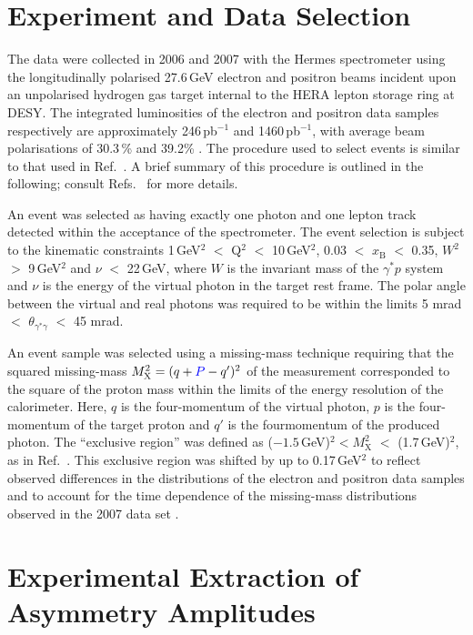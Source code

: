 \section{Experiment and Data Selection}
The data were collected in 2006 and 2007 with the H{\sc ermes}
spectrometer \cite{Ack98} using the longitudinally polarised 27.6\,GeV
electron and positron beams incident upon an unpolarised hydrogen gas
target internal to the HERA lepton storage ring at DESY. The integrated
luminosities of the electron and positron data samples respectively are
approximately 246\,pb$^{-1}$ and 1460\,pb$^{-1}$, with average beam polarisations of 30.3\,\% and 39.2\% \cite{Ben01}. The procedure used to select events is similar to that used in Ref.~\cite{Air09}.
A brief summary of this procedure is outlined in the following; consult
Refs.~\cite{Zei09,Bur10} for more details. 

An event
was selected as having exactly one photon and one lepton
track detected within the acceptance of the spectrometer.
The event selection is subject to the kinematic constraints 1\,GeV$^{2}$ $<$
Q$^{2}$ $<$ 10\,GeV$^{2}$, 0.03 $<$ $x_{\textrm{B}}$ $<$ 0.35, $W^{2}$ $>$
9\,GeV$^{2}$ and $\nu$ $<$ 22\,GeV, where $W$ is the invariant mass of the
$\gamma^{*}p$ system and $\nu$ is the energy of the virtual photon in the target
rest frame. The polar angle between the virtual and real photons was required to
be within the limits 5 mrad $<$
$\theta_{\gamma^{*}\gamma}$ $<$ 45 mrad. 

An event sample was selected using a missing-mass technique requiring
that the squared missing-mass $M_{\textrm{X}}^{2}=(q+{\color{blue}{P}\color{black}}-q')^{2}$
of the  measurement
corresponded to the square of the proton mass within the limits of the
energy resolution of the  calorimeter. Here, $q$ is the four-momentum of the virtual photon, $p$ is the  four-momentum of the target proton and $q'$ is the four\blue{-}momentum of the produced photon. The ``exclusive region'' was defined as ($-1.5$\,GeV)$^{2} < M_{\textrm{X}}^{2}$ $<$ (1.7\,GeV)$^{2}$, as in Ref.~\cite{Air09}. This exclusive region was shifted by up to 0.17\,GeV$^{2}$ to reflect observed differences in the distributions of the electron and positron data samples and to account for the time dependence of the missing-mass distributions observed in the 2007 data set \cite{Bur10}. 

\section{Experimental Extraction of Asymmetry Amplitudes}

